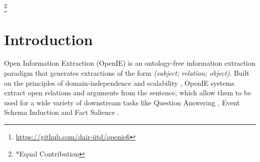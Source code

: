 \documentclass[11pt,a4paper]{article}
\title{\ztitle}
\author{
  Keshav Kolluru\textsuperscript{1*}, Vaibhav Adlakha\textsuperscript{1*}, Samarth Aggarwal\textsuperscript{1}, \\  \textbf{Mausam}\textsuperscript{1}, and \textbf{Soumen Chakrabarti}\textsuperscript{2}\\
  \textsuperscript{1} Indian Institute of Technology Delhi\\
  \texttt{keshav.kolluru@gmail.com, vaibhavadlakha95@gmail.com} \\
  \texttt{samarth.aggarwal.2510@gmail.com, mausam@cse.iitd.ac.in} \\
  \textsuperscript{2} Indian Institute of Technology Bombay\\
  \texttt{soumen@cse.iitb.ac.in}
}
\date{}
\newcommand{\shortname}{{\scshape IGL}}
\newcommand{\longname}{Iterative Grid Labeling}
\newcommand\blfootnote[1]{\begingroup
  \renewcommand\thefootnote{}\footnote{#1}\addtocounter{footnote}{-1}\endgroup
}
\begin{document}
\maketitle
\blfootnote{*Equal Contribution}

\begin{abstract}




A recent state-of-the-art neural open information extraction (OpenIE) system generates extractions iteratively, requiring repeated encoding of partial outputs. This comes at a significant computational cost. On the other hand, sequence labeling approaches for OpenIE are much faster, but worse in extraction quality. In this paper, we bridge this trade-off by presenting an iterative labeling-based system that establishes a new state of the art for OpenIE, while extracting 10$\times$ faster. This is achieved through a novel \longname\ (\shortname) architecture, which treats OpenIE as a 2-D grid labeling task. We improve its performance further by applying coverage (soft) constraints on the grid at training time. 

Moreover, on observing that the best OpenIE systems falter at handling coordination structures, our OpenIE system also incorporates a new coordination analyzer built with the same \shortname\ architecture. This \shortname\ based coordination analyzer helps our OpenIE system handle complicated coordination structures, while also establishing a new state of the art on the task of coordination analysis, 
with a 12.3 pts improvement in F1 over previous analyzers.
Our OpenIE system, \textbf{OpenIE6}\footnote{
\url{https://github.com/dair-iitd/openie6}}, beats the previous systems by as much as 4 pts in F1, while being much faster.
%
 \end{abstract}

\section{Introduction}
\label{sec:intro}
Open Information Extraction (OpenIE) is an ontology-free information extraction paradigm that generates extractions of the form \textit{(subject; relation; object)}.  Built on the principles of domain-independence and scalability \cite{mausam16}, OpenIE systems extract open relations and arguments from the sentence, which allow them to be used for a wide variety of downstream tasks like Question Answering \cite{yan&al18, khot&al17}, Event Schema Induction \cite{niranjan&al13} and Fact Salience \cite{marco&al18}.
\end{document}

